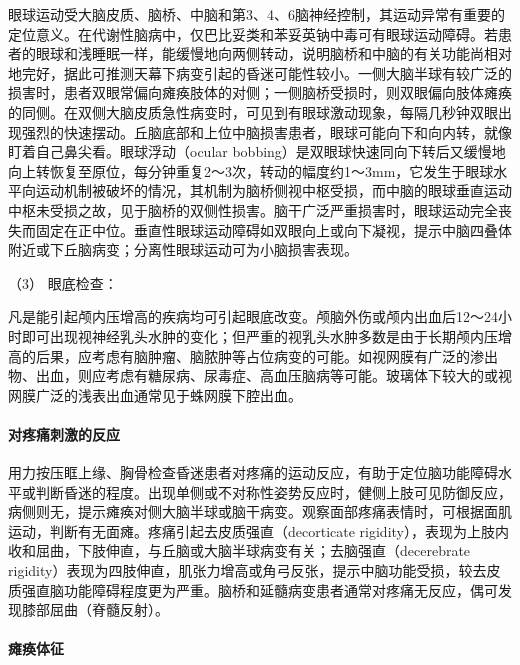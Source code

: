 眼球运动受大脑皮质、脑桥、中脑和第3、4、6脑神经控制，其运动异常有重要的定位意义。在代谢性脑病中，仅巴比妥类和苯妥英钠中毒可有眼球运动障碍。若患者的眼球和浅睡眠一样，能缓慢地向两侧转动，说明脑桥和中脑的有关功能尚相对地完好，据此可推测天幕下病变引起的昏迷可能性较小。一侧大脑半球有较广泛的损害时，患者双眼常偏向瘫痪肢体的对侧；一侧脑桥受损时，则双眼偏向肢体瘫痪的同侧。在双侧大脑皮质急性病变时，可见到有眼球激动现象，每隔几秒钟双眼出现强烈的快速摆动。丘脑底部和上位中脑损害患者，眼球可能向下和向内转，就像盯着自己鼻尖看。眼球浮动（ocular
bobbing）是双眼球快速同向下转后又缓慢地向上转恢复至原位，每分钟重复2～3次，转动的幅度约1～3mm，它发生于眼球水平向运动机制被破坏的情况，其机制为脑桥侧视中枢受损，而中脑的眼球垂直运动中枢未受损之故，见于脑桥的双侧性损害。脑干广泛严重损害时，眼球运动完全丧失而固定在正中位。垂直性眼球运动障碍如双眼向上或向下凝视，提示中脑四叠体附近或下丘脑病变；分离性眼球运动可为小脑损害表现。

\hypertarget{text00010.htmlux5cux23CHP1-2-2-1-3-1-3}{}
（3） 眼底检查：

凡是能引起颅内压增高的疾病均可引起眼底改变。颅脑外伤或颅内出血后12～24小时即可出现视神经乳头水肿的变化；但严重的视乳头水肿多数是由于长期颅内压增高的后果，应考虑有脑肿瘤、脑脓肿等占位病变的可能。如视网膜有广泛的渗出物、出血，则应考虑有糖尿病、尿毒症、高血压脑病等可能。玻璃体下较大的或视网膜广泛的浅表出血通常见于蛛网膜下腔出血。

\paragraph{对疼痛刺激的反应}

用力按压眶上缘、胸骨检查昏迷患者对疼痛的运动反应，有助于定位脑功能障碍水平或判断昏迷的程度。出现单侧或不对称性姿势反应时，健侧上肢可见防御反应，病侧则无，提示瘫痪对侧大脑半球或脑干病变。观察面部疼痛表情时，可根据面肌运动，判断有无面瘫。疼痛引起去皮质强直（decorticate
rigidity），表现为上肢内收和屈曲，下肢伸直，与丘脑或大脑半球病变有关；去脑强直（decerebrate
rigidity）表现为四肢伸直，肌张力增高或角弓反张，提示中脑功能受损，较去皮质强直脑功能障碍程度更为严重。脑桥和延髓病变患者通常对疼痛无反应，偶可发现膝部屈曲（脊髓反射）。

\paragraph{瘫痪体征}

